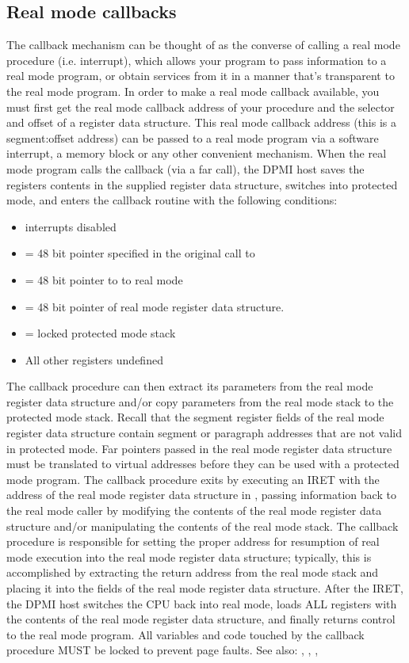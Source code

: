 \subsection{Real mode callbacks}
The callback mechanism can be thought of as the converse of calling a real
mode procedure (i.e. interrupt), which allows your program to pass
information to a real mode program, or obtain services from it in a manner
that's transparent to the real mode program.
In order to make a real mode callback available, you must first get the real
mode callback address of your procedure and the selector and offset of a
register data structure. This real mode callback address (this is a
segment:offset address) can be passed to a real mode program via a software
interrupt, a \dos memory block or any other convenient mechanism.
When the real mode program calls the callback (via a far call), the DPMI
host saves the registers contents in the supplied register data structure,
switches into protected mode, and enters the callback routine with the
following conditions:
\begin{itemize}
\item interrupts disabled
\item {} = 48 bit pointer specified in the original call to 
\item {} = 48 bit pointer to to real mode 
\item {} = 48 bit pointer of real mode register data
structure. 
\item {} = locked protected mode stack
\item  All other registers undefined
\end{itemize}
The callback procedure can then extract its parameters from the real mode
register data structure and/or copy parameters from the real mode stack to
the protected mode stack. Recall that the segment register fields of the
real mode register data structure contain segment or paragraph addresses
that are not valid in protected mode. Far pointers passed in the real mode
register data structure must be translated to virtual addresses before they
can be used with a protected mode program.
The callback procedure exits by executing an IRET with the address of the
real mode register data structure in , passing information back to
the real mode caller by modifying the contents of the real mode register
data structure and/or manipulating the contents of the real mode stack. The
callback procedure is responsible for setting the proper address for
resumption of real mode execution into the real mode register data
structure; typically, this is accomplished by extracting the return address
from the real mode stack and placing it into the  fields of the real
mode register data structure. After the IRET, the DPMI host switches the CPU
back into real mode, loads ALL registers with the contents of the real mode
register data structure, and finally returns control to the real mode
program.
All variables and code touched by the callback procedure MUST be locked to
prevent page faults.
See also: ,
, 
, 
